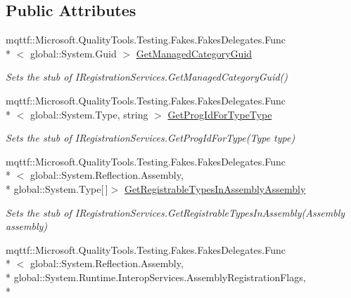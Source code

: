 \subsection*{Public Attributes}
\begin{DoxyCompactItemize}
\item 
mqttf\-::\-Microsoft.\-Quality\-Tools.\-Testing.\-Fakes.\-Fakes\-Delegates.\-Func\\*
$<$ global\-::\-System.\-Guid $>$ \hyperlink{class_system_1_1_runtime_1_1_interop_services_1_1_fakes_1_1_stub_i_registration_services_afb8e9e49cf89885d4ab77f1956e79820}{Get\-Managed\-Category\-Guid}
\begin{DoxyCompactList}\small\item\em Sets the stub of I\-Registration\-Services.\-Get\-Managed\-Category\-Guid()\end{DoxyCompactList}\item 
mqttf\-::\-Microsoft.\-Quality\-Tools.\-Testing.\-Fakes.\-Fakes\-Delegates.\-Func\\*
$<$ global\-::\-System.\-Type, string $>$ \hyperlink{class_system_1_1_runtime_1_1_interop_services_1_1_fakes_1_1_stub_i_registration_services_a2b868a1452cb71b2a1ef70b1fc0e3e22}{Get\-Prog\-Id\-For\-Type\-Type}
\begin{DoxyCompactList}\small\item\em Sets the stub of I\-Registration\-Services.\-Get\-Prog\-Id\-For\-Type(\-Type type)\end{DoxyCompactList}\item 
mqttf\-::\-Microsoft.\-Quality\-Tools.\-Testing.\-Fakes.\-Fakes\-Delegates.\-Func\\*
$<$ global\-::\-System.\-Reflection.\-Assembly, \\*
global\-::\-System.\-Type\mbox{[}$\,$\mbox{]}$>$ \hyperlink{class_system_1_1_runtime_1_1_interop_services_1_1_fakes_1_1_stub_i_registration_services_aee1d3b6893669e7c2edd434b8ff8a850}{Get\-Registrable\-Types\-In\-Assembly\-Assembly}
\begin{DoxyCompactList}\small\item\em Sets the stub of I\-Registration\-Services.\-Get\-Registrable\-Types\-In\-Assembly(\-Assembly assembly)\end{DoxyCompactList}\item 
mqttf\-::\-Microsoft.\-Quality\-Tools.\-Testing.\-Fakes.\-Fakes\-Delegates.\-Func\\*
$<$ global\-::\-System.\-Reflection.\-Assembly, \\*
global\-::\-System.\-Runtime.\-Interop\-Services.\-Assembly\-Registration\-Flags, \\*

\end{DoxyCompactItemize}
